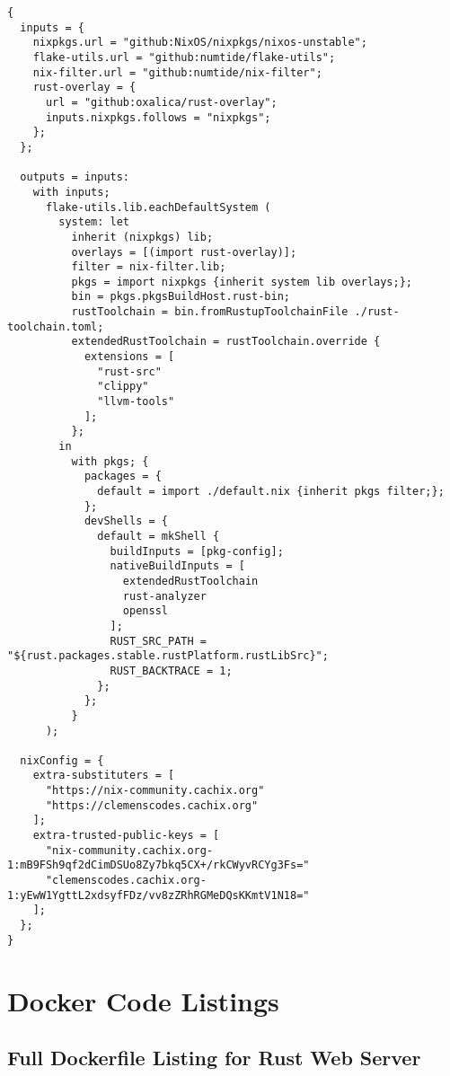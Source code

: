\label{appendix:nix:flake}
\begin{lstlisting}[caption={flake.nix for the application}, label=lst:flake]
{
  inputs = {
    nixpkgs.url = "github:NixOS/nixpkgs/nixos-unstable";
    flake-utils.url = "github:numtide/flake-utils";
    nix-filter.url = "github:numtide/nix-filter";
    rust-overlay = {
      url = "github:oxalica/rust-overlay";
      inputs.nixpkgs.follows = "nixpkgs";
    };
  };

  outputs = inputs:
    with inputs;
      flake-utils.lib.eachDefaultSystem (
        system: let
          inherit (nixpkgs) lib;
          overlays = [(import rust-overlay)];
          filter = nix-filter.lib;
          pkgs = import nixpkgs {inherit system lib overlays;};
          bin = pkgs.pkgsBuildHost.rust-bin;
          rustToolchain = bin.fromRustupToolchainFile ./rust-toolchain.toml;
          extendedRustToolchain = rustToolchain.override {
            extensions = [
              "rust-src"
              "clippy"
              "llvm-tools"
            ];
          };
        in
          with pkgs; {
            packages = {
              default = import ./default.nix {inherit pkgs filter;};
            };
            devShells = {
              default = mkShell {
                buildInputs = [pkg-config];
                nativeBuildInputs = [
                  extendedRustToolchain
                  rust-analyzer
                  openssl
                ];
                RUST_SRC_PATH = "${rust.packages.stable.rustPlatform.rustLibSrc}";
                RUST_BACKTRACE = 1;
              };
            };
          }
      );

  nixConfig = {
    extra-substituters = [
      "https://nix-community.cachix.org"
      "https://clemenscodes.cachix.org"
    ];
    extra-trusted-public-keys = [
      "nix-community.cachix.org-1:mB9FSh9qf2dCimDSUo8Zy7bkq5CX+/rkCWyvRCYg3Fs="
      "clemenscodes.cachix.org-1:yEwW1YgttL2xdsyfFDz/vv8zZRhRGMeDQsKKmtV1N18="
    ];
  };
}
\end{lstlisting}

\chapter{Docker Code Listings}

\section{Full Dockerfile Listing for Rust Web Server}

